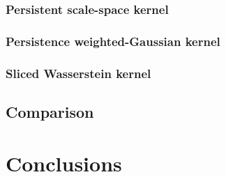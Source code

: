 \documentclass[a4paper,11pt,openany,extrafontsizes]{memoir}
\begin{document}
\subsection{Persistent scale-space kernel}

\cite{reininghaus_stable_2015,kwitt_statistical_2015}

\subsection{Persistence weighted-Gaussian kernel}

\cite{kusano_kernel_2017}

\subsection{Sliced Wasserstein kernel}

\cite{carriere_sliced_2017}

\section{Comparison}%
\label{sec:comparison}

\chapter{Conclusions}%
\label{cha:conclusions}




\backmatter%

\printbibliography%
\end{document}
